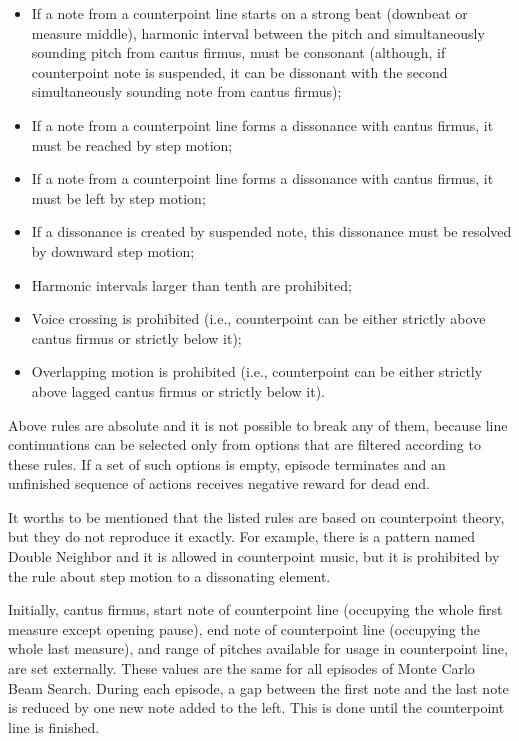 \documentclass{article}
\begin{document}
\begin{itemize}
	\item If a note from a counterpoint line starts on a strong beat (downbeat or measure middle), harmonic interval between the pitch and simultaneously sounding pitch from cantus firmus, must be consonant (although, if counterpoint note is suspended, it can be dissonant with the second simultaneously sounding note from cantus firmus);
	\item If a note from a counterpoint line forms a dissonance with cantus firmus, it must be reached by step motion;
	\item If a note from a counterpoint line forms a dissonance with cantus firmus, it must be left by step motion;
	\item If a dissonance is created by suspended note, this dissonance must be resolved by downward step motion;
	\item Harmonic intervals larger than tenth are prohibited;
	\item Voice crossing is prohibited (i.e., counterpoint can be either strictly above cantus firmus or strictly below it);
	\item Overlapping motion is prohibited (i.e., counterpoint can be either strictly above lagged cantus firmus or strictly below it).
\end{itemize}

Above rules are absolute and it is not possible to break any of them, because line continuations can be selected only from options that are filtered according to these rules. If a set of such options is empty, episode terminates and an unfinished sequence of actions receives negative reward for dead end.

It worths to be mentioned that the listed rules are based on counterpoint theory, but they do not reproduce it exactly. For example, there is a pattern named Double Neighbor and it is allowed in counterpoint music, but it is prohibited by the rule about step motion to a dissonating element.

Initially, cantus firmus, start note of counterpoint line (occupying the whole first measure except opening pause), end note of counterpoint line (occupying the whole last measure), and range of pitches available for usage in counterpoint line, are set externally. These values are the same for all episodes of Monte Carlo Beam Search. During each episode, a gap between the first note and the last note is reduced by one new note added to the left. This is done until the counterpoint line is finished.
\end{document}
